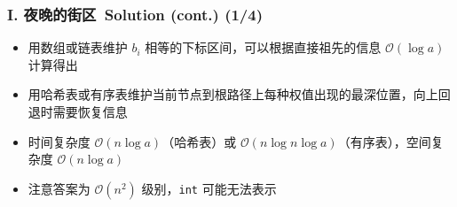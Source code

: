 \documentclass[notheorems]{beamer}
\newcommand{\zhProbI}{夜晚的街区}		\newcommand{\DiffI}{Hard}		\newcommand{\AuthProbI}{\texttt{Chielo}}		\newcommand{\TestProbI}{\texttt{skywalkert}}
\newcommand{\AccInProbI}{1}	\newcommand{\SubInProbI}{4}	\newcommand{\RatInProbI}{25.00\%}
\begin{document}
\begin{frame}
\frametitle{\\ I. \zhProbI\ Solution (cont.) (\AccInProbI/\SubInProbI)}
\begin{spacing}{1.5} \large
\begin{itemize}
\item 用数组或链表维护 $b_i$ 相等的下标区间，可以根据直接祖先的信息 $\mathcal{O}(\log a)$ 计算得出
\item 用哈希表或有序表维护当前节点到根路径上每种权值出现的最深位置，向上回退时需要恢复信息
\item 时间复杂度 $\mathcal{O}(n \log a)$（哈希表）或 $\mathcal{O}(n \log n \log a)$（有序表），空间复杂度 $\mathcal{O}(n \log a)$
\item 注意答案为 $\mathcal{O}(n^2)$ 级别，\texttt{int} 可能无法表示
\end{itemize}
\end{spacing}
\end{frame}
\end{document}
